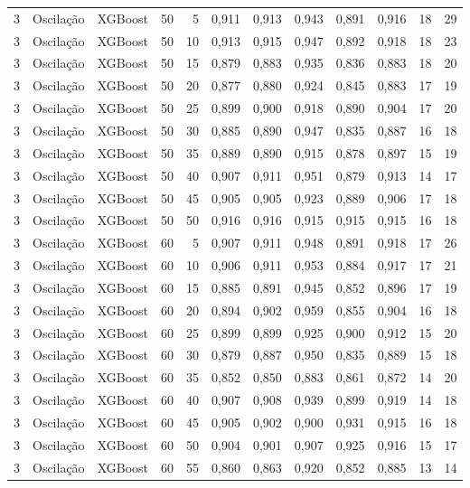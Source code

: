 \begin{longtable}{@{}rllrrrrrrrrr@{}}
3 & Oscilação & XGBoost & 50 & 5 & 0,911 & 0,913 & 0,943 & 0,891 & 0,916 & 18 & 29 \\
3 & Oscilação & XGBoost & 50 & 10 & 0,913 & 0,915 & 0,947 & 0,892 & 0,918 & 18 & 23 \\
3 & Oscilação & XGBoost & 50 & 15 & 0,879 & 0,883 & 0,935 & 0,836 & 0,883 & 18 & 20 \\
3 & Oscilação & XGBoost & 50 & 20 & 0,877 & 0,880 & 0,924 & 0,845 & 0,883 & 17 & 19 \\
3 & Oscilação & XGBoost & 50 & 25 & 0,899 & 0,900 & 0,918 & 0,890 & 0,904 & 17 & 20 \\
3 & Oscilação & XGBoost & 50 & 30 & 0,885 & 0,890 & 0,947 & 0,835 & 0,887 & 16 & 18 \\
3 & Oscilação & XGBoost & 50 & 35 & 0,889 & 0,890 & 0,915 & 0,878 & 0,897 & 15 & 19 \\
3 & Oscilação & XGBoost & 50 & 40 & 0,907 & 0,911 & 0,951 & 0,879 & 0,913 & 14 & 17 \\
3 & Oscilação & XGBoost & 50 & 45 & 0,905 & 0,905 & 0,923 & 0,889 & 0,906 & 17 & 18 \\
3 & Oscilação & XGBoost & 50 & 50 & 0,916 & 0,916 & 0,915 & 0,915 & 0,915 & 16 & 18 \\
3 & Oscilação & XGBoost & 60 & 5 & 0,907 & 0,911 & 0,948 & 0,891 & 0,918 & 17 & 26 \\
3 & Oscilação & XGBoost & 60 & 10 & 0,906 & 0,911 & 0,953 & 0,884 & 0,917 & 17 & 21 \\
3 & Oscilação & XGBoost & 60 & 15 & 0,885 & 0,891 & 0,945 & 0,852 & 0,896 & 17 & 19 \\
3 & Oscilação & XGBoost & 60 & 20 & 0,894 & 0,902 & 0,959 & 0,855 & 0,904 & 16 & 18 \\
3 & Oscilação & XGBoost & 60 & 25 & 0,899 & 0,899 & 0,925 & 0,900 & 0,912 & 15 & 20 \\
3 & Oscilação & XGBoost & 60 & 30 & 0,879 & 0,887 & 0,950 & 0,835 & 0,889 & 15 & 18 \\
3 & Oscilação & XGBoost & 60 & 35 & 0,852 & 0,850 & 0,883 & 0,861 & 0,872 & 14 & 20 \\
3 & Oscilação & XGBoost & 60 & 40 & 0,907 & 0,908 & 0,939 & 0,899 & 0,919 & 14 & 18 \\
3 & Oscilação & XGBoost & 60 & 45 & 0,905 & 0,902 & 0,900 & 0,931 & 0,915 & 16 & 18 \\
3 & Oscilação & XGBoost & 60 & 50 & 0,904 & 0,901 & 0,907 & 0,925 & 0,916 & 15 & 17 \\
3 & Oscilação & XGBoost & 60 & 55 & 0,860 & 0,863 & 0,920 & 0,852 & 0,885 & 13 & 14 \\

\end{longtable}
